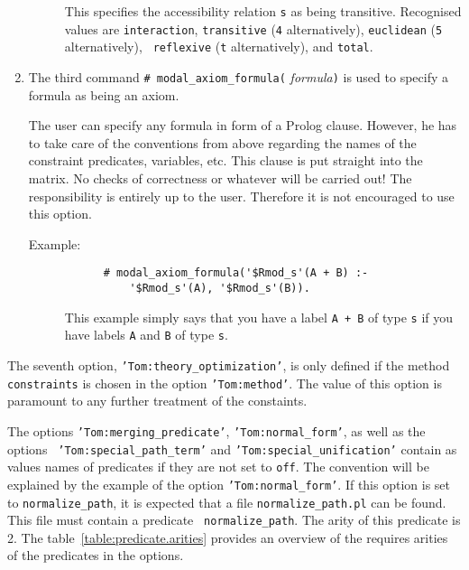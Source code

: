\begin{enumerate}
\begin{description}
	This specifies the accessibility relation {\tt s} as being
	transitive. Recognised values are {\tt interaction}, {\tt transitive}
	({\tt 4} alternatively), {\tt euclidean} ({\tt 5} alternatively), {\tt
	reflexive} ({\tt t} alternatively), and {\tt total}.
      \end{description}


\item The third command {\tt \# modal\_axiom\_formula(}{\em
      formula}\/{\tt )} is used to specify a formula as being an axiom.

      The user can specify any formula in form of a Prolog clause. However,
      he has to take care of the conventions from above regarding the names
      of the constraint predicates, variables, etc. This clause is put
      straight into the matrix. No checks of correctness or whatever will
      be carried out! The responsibility is entirely up to the user. Therefore
      it is not encouraged to use this option.

      \begin{description}
	\item[Example:]
      \begin{verbatim}
      # modal_axiom_formula('$Rmod_s'(A + B) :-
          '$Rmod_s'(A), '$Rmod_s'(B)).
      \end{verbatim}

      This example simply says that you have a label {\tt A + B} of type
      {\tt s} if you have labels {\tt A} and {\tt B} of type {\tt s}.
      \end{description}

\end{enumerate}

The seventh option, {\tt 'Tom:theory\_optimization'}, is only defined if the
method {\tt constraints} is chosen in the option {\tt 'Tom:method'}. The value
of this option is paramount to any further treatment of the constaints.

The options {\tt 'Tom:merging\_predicate'}, {\tt 'Tom:normal\_form'}, as well
as the options {\tt
'Tom:special\_path\_term'} and {\tt 'Tom:special\_unification'} contain as
values names of predicates if they are not set to {\tt off}. The convention
will be explained by the example of the option {\tt 'Tom:normal\_form'}.
If this option is set to {\tt normalize\_path}, it is expected that a file
{\tt normalize\_path.pl} can be found. This file must contain a predicate {\tt
normalize\_path}. The arity of this predicate is 2. The
table~\ref{table:predicate.arities} provides an overview of the requires
arities of the predicates in the options.

